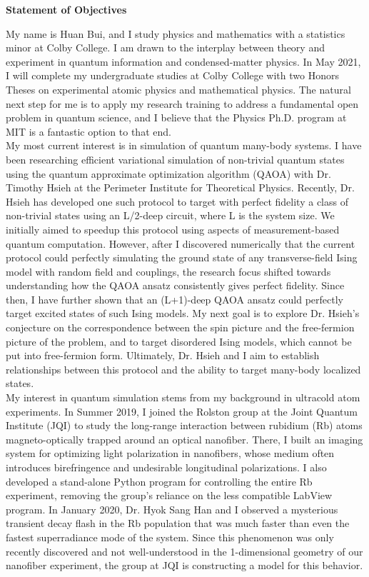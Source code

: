 \documentclass[12pt]{article}
\begin{document}
\begin{center}
	\textbf{Statement of Objectives}
\end{center}
My name is Huan Bui, and I study physics and mathematics with a statistics minor at Colby College. I am drawn to the interplay between theory and experiment in quantum information and condensed-matter physics.  In May 2021, I will complete my undergraduate studies at Colby College with two Honors Theses on experimental atomic physics and mathematical physics. The natural next step for me is to apply my research training to address a fundamental open problem in quantum science, and I believe that the Physics Ph.D. program at MIT is a fantastic option to that end.  \\ 

My most current interest is in simulation of quantum many-body systems. I have been researching efficient variational simulation of non-trivial quantum states using the quantum approximate optimization algorithm (QAOA) with Dr. Timothy Hsieh at the Perimeter Institute for Theoretical Physics. Recently, Dr. Hsieh has developed one such protocol to target with perfect fidelity a class of non-trivial states using an L/2-deep circuit, where L is the system size. We initially aimed to speedup this protocol using aspects of measurement-based quantum computation. However, after I discovered numerically that the current protocol could perfectly simulating the ground state of any transverse-field Ising model with random field and couplings, the research focus shifted towards understanding how the QAOA ansatz consistently gives perfect fidelity. Since then, I have further shown that an (L+1)-deep QAOA ansatz could perfectly target excited states of such Ising models. My next goal is to explore Dr. Hsieh's conjecture on the correspondence between the spin picture and the free-fermion picture of the problem, and to target disordered Ising models, which cannot be put into free-fermion form. Ultimately, Dr. Hsieh and I aim to establish relationships between this protocol and the ability to target many-body localized states.\\

My interest in quantum simulation stems from my background in ultracold atom experiments. In Summer 2019, I joined the Rolston group at the Joint Quantum Institute (JQI) to study the long-range interaction between rubidium (Rb) atoms magneto-optically trapped around an optical nanofiber. There, I built an imaging system for optimizing light polarization in nanofibers, whose medium often introduces birefringence and undesirable longitudinal polarizations. I also developed a stand-alone Python program for controlling the entire Rb experiment, removing the group's reliance on the less compatible LabView program. In January 2020, Dr. Hyok Sang Han and I observed a mysterious transient decay flash in the Rb population that was much faster than even the fastest superradiance mode of the system. Since this phenomenon was only recently discovered and not well-understood in the 1-dimensional geometry of our nanofiber experiment, the group at JQI is constructing a model for this behavior.   \\ 
\end{document}
